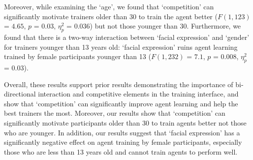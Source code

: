 \documentclass[10pt,journal,compsoc]{IEEEtran}
\begin{document}
Moreover, while examining the `age', we found that `competition' can significantly motivate trainers older than 30 to train the agent better ($F(1,123)$ = $4.65$, $p$ = $0.03$, $\eta_{p}^{2}$ = $0.036$)  %
but not %
those younger than 30. %
Furthermore, we found that %
there is a two-way interaction between `facial expression' and `gender' for trainers younger than 13 years old: `facial expression' 
ruins agent learning trained by female participants younger than 13 ($F(1,232)$ = $7.1$, $p$ = $0.008$, $\eta_{p}^{2}$ = $0.03$).


Overall, these results support prior results \cite{li2014learning} demonstrating the importance of bi-directional interaction and competitive elements in the training interface, and show that `competition' can significantly improve agent learning and help the best trainers the most. Moreover, our results show that %
`competition' can significantly motivate participants older than 30 to train agents better not those who are younger.
In addition, our results suggest that `facial expression' %
has a significantly negative effect on agent training by female participants, especially those who are less than 13 years old and cannot train agents to perform well. %
\end{document}
